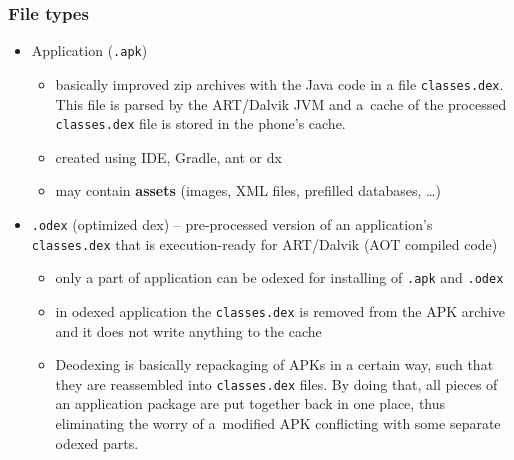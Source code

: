 \documentclass[10pt,xcolor=pdflatex]{beamer}
\begin{document}
\begin{frame}[fragile]\frametitle{File types}
	\begin{itemize}
      \item Application (\texttt{.apk})
        \begin{itemize}
          \item basically improved zip archives with the Java code in a file \texttt{classes.dex}. This file is parsed by the ART/Dalvik JVM and a~cache of the processed \texttt{classes.dex} file is stored in the phone's cache.
          \item created using IDE, Gradle, ant or dx
          \item may contain \textbf{assets} (images, XML files, prefilled databases, \ldots)
        \end{itemize}
      \item \texttt{.odex} (optimized dex) -- pre-processed version of an application's \texttt{classes.dex} that is execution-ready for ART/Dalvik (AOT compiled code)
        \begin{itemize}
          \item only a part of application can be odexed for installing of \texttt{.apk} and \texttt{.odex}
          \item in odexed application the \texttt{classes.dex} is removed from the APK archive and it does not write anything to the cache
          \item Deodexing is basically repackaging of APKs in a certain way, such that they are reassembled into \texttt{classes.dex} files. By doing that, all pieces of an application package are put together back in one place, thus eliminating the worry of a~modified APK conflicting with some separate odexed parts.
        \end{itemize}
	\end{itemize}
\end{frame}
\end{document}
